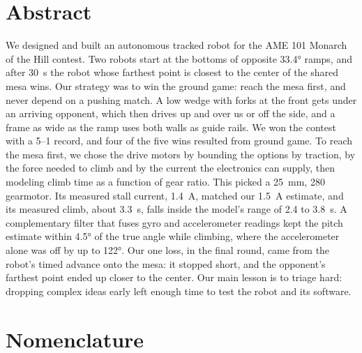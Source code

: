 \section*{Abstract}
We designed and built an autonomous tracked robot for the AME 101 Monarch of the Hill contest. Two robots start at the bottoms of opposite \ang{33.4} ramps, and after \qty{30}{s} the robot whose farthest point is closest to the center of the shared mesa wins. Our strategy was to win the ground game: reach the mesa first, and never depend on a pushing match. A low wedge with forks at the front gets under an arriving opponent, which then drives up and over us or off the side, and a frame as wide as the ramp uses both walls as guide rails. We won the contest with a 5--1 record, and four of the five wins resulted from ground game. To reach the mesa first, we chose the drive motors by bounding the options by traction, by the force needed to climb and by the current the electronics can supply, then modeling climb time as a function of gear ratio. This picked a \qty{25}{mm}, \qty{280}{\rpm} gearmotor. Its measured stall current, \qty{1.4}{A}, matched our \qty{1.5}{A} estimate, and its measured climb, about \qty{3.3}{s}, falls inside the model's range of 2.4 to \qty{3.8}{s}. A complementary filter that fuses gyro and accelerometer readings kept the pitch estimate within \ang{4.5} of the true angle while climbing, where the accelerometer alone was off by up to \ang{122}. Our one loss, in the final round, came from the robot's timed advance onto the mesa: it stopped short, and the opponent's farthest point ended up closer to the center. Our main lesson is to triage hard: dropping complex ideas early left enough time to test the robot and its software.

\vspace{0.5\baselineskip}
{\setlength{\parskip}{0pt}\setcounter{tocdepth}{1}\tableofcontents}

\clearpage
\section*{Nomenclature}

